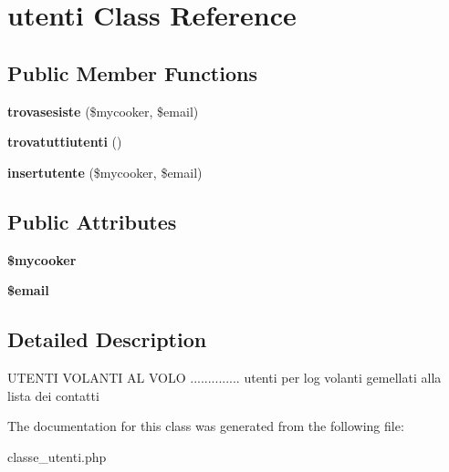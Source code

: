 \hypertarget{classutenti}{\section{utenti Class Reference}
\label{classutenti}
}
\subsection*{Public Member Functions}
\begin{DoxyCompactItemize}
\item 
\hypertarget{classutenti_a2fdcaf8f91155e44c816777a3344e5ea}{{\bfseries trovasesiste} (\$mycooker, \$email)}\label{classutenti_a2fdcaf8f91155e44c816777a3344e5ea}

\item 
\hypertarget{classutenti_a1567fd92aad07f2c6f7d654e5f78feba}{{\bfseries trovatuttiutenti} ()}\label{classutenti_a1567fd92aad07f2c6f7d654e5f78feba}

\item 
\hypertarget{classutenti_a5279868f0d41b34cfef16af908c61f4d}{{\bfseries insertutente} (\$mycooker, \$email)}\label{classutenti_a5279868f0d41b34cfef16af908c61f4d}

\end{DoxyCompactItemize}
\subsection*{Public Attributes}
\begin{DoxyCompactItemize}
\item 
\hypertarget{classutenti_ad452dbee2dcda1919946f2c768fd5d0d}{{\bfseries \$mycooker}}\label{classutenti_ad452dbee2dcda1919946f2c768fd5d0d}

\item 
\hypertarget{classutenti_a333fcea259e24dfe3240892734194297}{{\bfseries \$email}}\label{classutenti_a333fcea259e24dfe3240892734194297}

\end{DoxyCompactItemize}


\subsection{Detailed Description}
U\-T\-E\-N\-T\-I V\-O\-L\-A\-N\-T\-I A\-L V\-O\-L\-O .............. utenti per log volanti gemellati alla lista dei contatti 

The documentation for this class was generated from the following file\-:\begin{DoxyCompactItemize}
\item 
classe\-\_\-utenti.\-php\end{DoxyCompactItemize}
